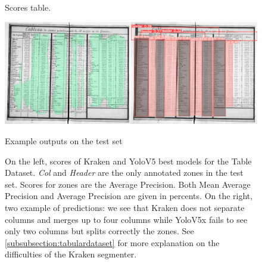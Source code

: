 \documentclass{jdmdh}
\begin{document}
\begin{figure}
\begin{minipage}{.5\linewidth}
\centering
{}
\caption{Scores table.}
\label{tab:scores:table}
\end{minipage}%
\begin{minipage}{.5\linewidth}
\includegraphics[width=\linewidth]{images/tableexemple.jpg}
\caption{Example outputs on the test set}
\label{fig:output:table}
\corrauthor{}{}
\end{minipage}%
\caption{On the left, scores of Kraken and YoloV5 best models for the Table Dataset. \textit{Col} and \textit{Header} are the only annotated zones in the test set. Scores for zones are the Average Precision. Both Mean Average Precision and Average Precision are given in percents. On the right, two example of predictions: we see that Kraken does not separate columns and merges up to four columns while YoloV5x fails to see only two columns but splits correctly the zones. See \ref{subsubsection:tabulardataset} for more explanation on the difficulties of the Kraken segmenter.}
\end{figure}
\end{document}
